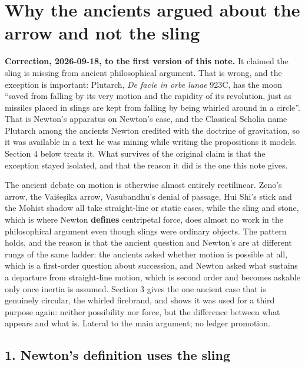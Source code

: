 \documentclass[11pt,a4paper]{article}
\begin{document}
\hypertarget{why-the-ancients-argued-about-the-arrow-and-not-the-sling}{%
\section{Why the ancients argued about the arrow and not the
sling}\label{why-the-ancients-argued-about-the-arrow-and-not-the-sling}}

\textbf{Correction, 2026-09-18, to the first version of this note.} It
claimed the sling is missing from ancient philosophical argument. That
is wrong, and the exception is important: Plutarch, \emph{De facie in
orbe lunae} 923C, has the moon ``saved from falling by its very motion
and the rapidity of its revolution, just as missiles placed in slings
are kept from falling by being whirled around in a circle''. That is
Newton's apparatus on Newton's case, and the Classical Scholia name
Plutarch among the ancients Newton credited with the doctrine of
gravitation, so it was available in a text he was mining while writing
the propositions it models. Section 4 below treats it. What survives of
the original claim is that the exception stayed isolated, and that the
reason it did is the one this note gives.

The ancient debate on motion is otherwise almost entirely rectilinear.
Zeno's arrow, the Vaiśeṣika arrow, Vasubandhu's denial of passage, Hui
Shi's stick and the Mohist shadow all take straight-line or static
cases, while the sling and stone, which is where Newton \textbf{defines}
centripetal force, does almost no work in the philosophical argument
even though slings were ordinary objects. The pattern holds, and the
reason is that the ancient question and Newton's are at different rungs
of the same ladder: the ancients asked whether motion is possible at
all, which is a first-order question about succession, and Newton asked
what sustains a departure from straight-line motion, which is second
order and becomes askable only once inertia is assumed. Section 3 gives
the one ancient case that is genuinely circular, the whirled firebrand,
and shows it was used for a third purpose again: neither possibility nor
force, but the difference between what appears and what is. Lateral to
the main argument; no ledger promotion.

\hypertarget{newtons-definition-uses-the-sling}{%
\subsection{1. Newton's definition uses the
sling}\label{newtons-definition-uses-the-sling}}
\end{document}

